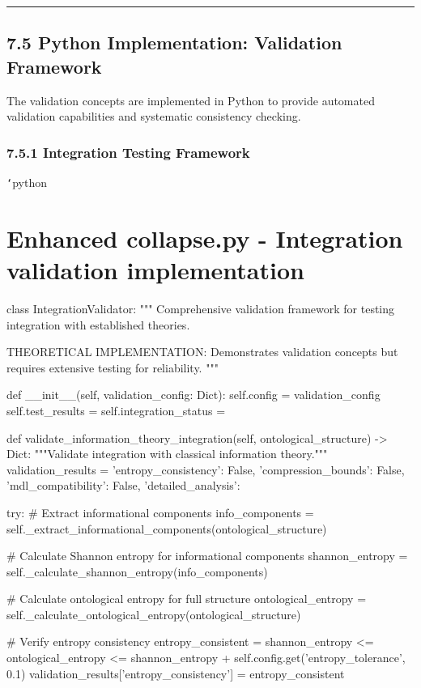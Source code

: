\hrule

\section{7.5 Python Implementation: Validation Framework}

The validation concepts are implemented in Python to provide automated validation capabilities and systematic consistency checking.

\subsection{7.5.1 Integration Testing Framework}

\texttt{`}python
\chapter{Enhanced collapse.py - Integration validation implementation}
class IntegrationValidator:
    """
    Comprehensive validation framework for testing integration with established theories.
    
    THEORETICAL IMPLEMENTATION: Demonstrates validation concepts
    but requires extensive testing for reliability.
    """
    
    def __init__(self, validation_config: Dict):
        self.config = validation_config
        self.test_results = {}
        self.integration_status = {}
        
    def validate_information_theory_integration(self, ontological_structure) -> Dict:
        """Validate integration with classical information theory."""
        validation_results = {
            'entropy_consistency': False,
            'compression_bounds': False,
            'mdl_compatibility': False,
            'detailed_analysis': {}
        }
        
        try:
            \# Extract informational components
            info_components = self._extract_informational_components(ontological_structure)
            
            \# Calculate Shannon entropy for informational components
            shannon_entropy = self._calculate_shannon_entropy(info_components)
            
            \# Calculate ontological entropy for full structure
            ontological_entropy = self._calculate_ontological_entropy(ontological_structure)
            
            \# Verify entropy consistency
            entropy_consistent = shannon_entropy <= ontological_entropy <= shannon_entropy + self.config.get('entropy_tolerance', 0.1)
            validation_results['entropy_consistency'] = entropy_consistent
            
